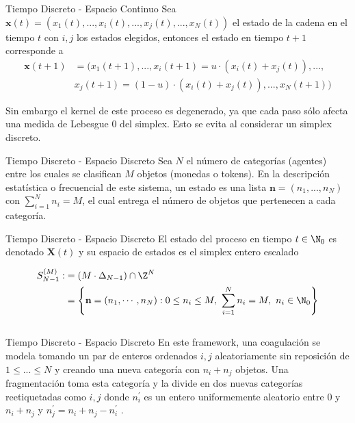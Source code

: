 \begin{frame}{Tiempo Discreto - Espacio Continuo}
Sea $\mathbf{x}(t) = (x_{1}(t),..., x_{i}(t), ..., x_{j}(t), ..., x_{N}(t))$ el estado de la cadena en el tiempo $t$ con $i,j$ los estados elegidos, entonces el estado en tiempo $t+1$ corresponde a 
\begin{align*}
    \mathbf{x}(t+1) 
    &= 
(x_{1}(t+1),...,
x_{i}(t+1) = u\cdot(x_{i}(t)+x_{j}(t)), ...,\\
    &x_{j}(t+1) = (1-u)\cdot(x_{i}(t)+x_{j}(t)) 
, ..., x_{N}(t+1))
\end{align*}

Sin embargo el kernel de este proceso es degenerado, ya que cada paso sólo afecta una medida de Lebesgue $0$ del simplex. Esto se evita al considerar un simplex discreto.
\end{frame}

\begin{frame}{Tiempo Discreto - Espacio Discreto}
Sea $N$ el número de categorías (agentes) entre los cuales se clasifican $M$ objetos (monedas o tokens). En la descripción estatística o frecuencial de este sistema, un estado es una lista $\mathbf{n} = (n_{1},..., n_{N})$ con $\sum\limits_{i=1}^{N} n_{i} = M$,  el cual entrega el número de objetos que pertenecen a cada categoría. 
\end{frame}

\begin{frame}{Tiempo Discreto - Espacio Discreto}
El estado del proceso en tiempo $t\in \N_{0}$ es denotado $\mathbf{X}(t) $ y su espacio de estados es el simplex entero escalado 
\begin{small}
\begin{align*}
S_{N-1}^{(M)} 
:&= (M\cdot \Delta_{N-1}) \cap \Z^{N}\\
&= \left\{ \mathbf{n} = (n_{1},\cdots, n_{N}): 0\leq n_{i}\leq M,\ \sum\limits_{i=1}^{N}n_{i} = M,\ n_{i}\in \N_{0} \right\}
\end{align*}
\end{small}
\[
\]
\end{frame}

\begin{frame}{Tiempo Discreto - Espacio Discreto}
En este framework, una coagulación se modela tomando un par de enteros ordenados $i,j$ aleatoriamente sin reposición de $1\leq ... \leq N$ y creando una nueva categoría con $n_{i} + n_{j}$ objetos. Una fragmentación toma esta categoría y la divide en dos nuevas categorías reetiquetadas como $i,j$ donde $n_{i}^{\prime}$ es un entero uniformemente aleatorio entre $0$ y $n_{i}+ n_{j}$ y $n_{j}^{\prime}= n_{i} + n_{j}- n_{i}^{\prime}$ .

\end{frame}


